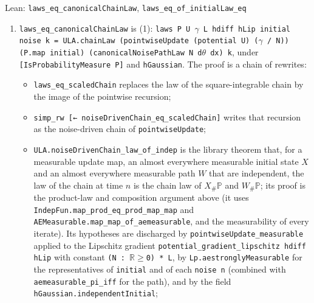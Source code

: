 \documentclass[11pt,a4paper]{article}
\begin{document}
\begin{leanbox}{Lean: \texttt{laws\_\allowbreak{}eq\_\allowbreak{}canonicalChainLaw}, \texttt{laws\_\allowbreak{}eq\_\allowbreak{}of\_\allowbreak{}initialLaw\_\allowbreak{}eq}}
\begin{enumerate}


\item \texttt{laws\_\allowbreak{}eq\_\allowbreak{}canonical\allowbreak{}Chain\allowbreak{}Law} is (1): \texttt{laws P U \ensuremath{\gamma} L hdiff h\allowbreak{}Lip initial noise k = ULA.\allowbreak{}chain\allowbreak{}Law (pointwise\allowbreak{}Update (potential U) (\ensuremath{\gamma} /\allowbreak{} N)) (P.\allowbreak{}map initial) (canonical\allowbreak{}Noise\allowbreak{}Path\allowbreak{}Law N d\ensuremath{\theta} dx) k}, under \texttt{[Is\allowbreak{}Probability\allowbreak{}Measure P]} and \texttt{h\allowbreak{}Gaussian}. The proof is a chain of rewrites:

\begin{itemize}


\item \texttt{laws\_\allowbreak{}eq\_\allowbreak{}scaled\allowbreak{}Chain} replaces the law of the square-integrable chain by the image of the pointwise recursion;

\item \texttt{simp\_\allowbreak{}rw [← noise\allowbreak{}Driven\allowbreak{}Chain\_\allowbreak{}eq\_\allowbreak{}scaled\allowbreak{}Chain]} writes that recursion as the noise-driven chain of \texttt{pointwise\allowbreak{}Update};

\item \texttt{ULA.\allowbreak{}noise\allowbreak{}Driven\allowbreak{}Chain\_\allowbreak{}law\_\allowbreak{}of\_\allowbreak{}indep} is the library theorem that, for a measurable update map, an almost everywhere measurable initial state \(X\) and an almost everywhere measurable path \(W\) that are independent, the law of the chain at time \(n\) is the chain law of \(X_\#\mathbb P\) and \(W_\#\mathbb P\); its proof is the product-law and composition argument above (it uses \texttt{Indep\allowbreak{}Fun.\allowbreak{}map\_\allowbreak{}prod\_\allowbreak{}eq\_\allowbreak{}prod\_\allowbreak{}map\_\allowbreak{}map} and \texttt{AEMeasurable.\allowbreak{}map\_\allowbreak{}map\_\allowbreak{}of\_\allowbreak{}aemeasurable}, and the measurability of every iterate). Its hypotheses are discharged by \texttt{pointwise\allowbreak{}Update\_\allowbreak{}measurable} applied to the Lipschitz gradient \texttt{potential\_\allowbreak{}gradient\_\allowbreak{}lipschitz hdiff h\allowbreak{}Lip} with constant \texttt{(N : \ensuremath{\mathbb R}\ensuremath{\ge}0) * L}, by \texttt{Lp.\allowbreak{}aestrongly\allowbreak{}Measurable} for the representatives of \texttt{initial} and of each \texttt{noise n} (combined with \texttt{aemeasurable\_\allowbreak{}pi\_\allowbreak{}iff} for the path), and by the field \texttt{h\allowbreak{}Gaussian.\allowbreak{}independent\allowbreak{}Initial};


\end{itemize}
\end{enumerate}
\end{leanbox}
\end{document}
